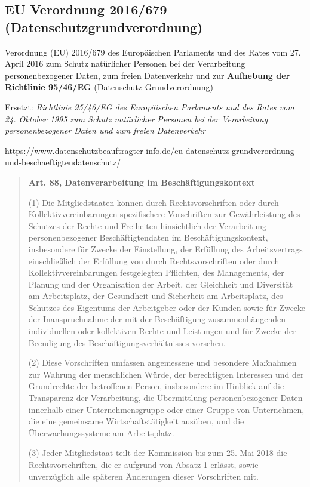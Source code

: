     
  \subsection*{EU Verordnung 2016/679 (Datenschutzgrundverordnung)}
  
    Verordnung (EU) 2016/679 des Europäischen Parlaments und des Rates vom 27. April 2016 zum Schutz natürlicher Personen bei der Verarbeitung personenbezogener Daten, zum freien Datenverkehr und zur \textbf{Aufhebung der Richtlinie 95/46/EG} (Datenschutz-Grundverordnung)
    
    Ersetzt: \textit{Richtlinie 95/46/EG des Europäischen Parlaments und des Rates vom 24. Oktober 1995 zum Schutz natürlicher Personen bei der Verarbeitung personenbezogener Daten und zum freien Datenverkehr}
    
    https://www.datenschutzbeauftragter-info.de/eu-datenschutz-grundverordnung-und-beschaeftigtendatenschutz/
      
    \begin{quotation}
      \textbf{Art. 88, Datenverarbeitung im Beschäftigungskontext}
    
      (1) Die Mitgliedstaaten können durch Rechtsvorschriften oder durch Kollektivvereinbarungen spezifischere Vorschriften zur Gewährleistung des Schutzes der Rechte und Freiheiten hinsichtlich der Verarbeitung personenbezogener Beschäftigtendaten im Beschäftigungskontext, insbesondere für Zwecke der Einstellung, der Erfüllung des Arbeitsvertrags einschließlich der Erfüllung von durch Rechtsvorschriften oder durch Kollektivvereinbarungen festgelegten Pflichten, des Managements, der Planung und der Organisation der Arbeit, der Gleichheit und Diversität am Arbeitsplatz, der Gesundheit und Sicherheit am Arbeitsplatz, des Schutzes des Eigentums der Arbeitgeber oder der Kunden sowie für Zwecke der Inanspruchnahme der mit der Beschäftigung zusammenhängenden individuellen oder kollektiven Rechte und Leistungen und für Zwecke der Beendigung des Beschäftigungsverhältnisses vorsehen.
      
      (2) Diese Vorschriften umfassen angemessene und besondere Maßnahmen zur Wahrung der menschlichen Würde, der berechtigten Interessen und der Grundrechte der betroffenen Person, insbesondere im Hinblick auf die Transparenz der Verarbeitung, die Übermittlung personenbezogener Daten innerhalb einer Unternehmensgruppe oder einer Gruppe von Unternehmen, die eine gemeinsame Wirtschaftstätigkeit ausüben, und die Überwachungssysteme am Arbeitsplatz.
      
      (3) Jeder Mitgliedstaat teilt der Kommission bis zum 25. Mai 2018 die Rechtsvorschriften, die er aufgrund von Absatz 1 erlässt, sowie unverzüglich alle späteren Änderungen dieser Vorschriften mit.
    \end{quotation}    